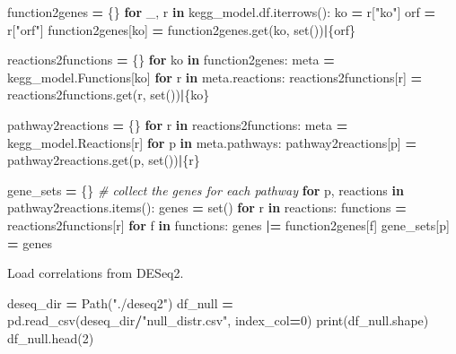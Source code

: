 \documentclass[
]{book}
\newenvironment{Shaded}{\begin{snugshade}}{\end{snugshade}}
\newcommand{\BuiltInTok}[1]{#1}
\newcommand{\CommentTok}[1]{\textcolor[rgb]{0.56,0.35,0.01}{\textit{#1}}}
\newcommand{\ControlFlowTok}[1]{\textcolor[rgb]{0.13,0.29,0.53}{\textbf{#1}}}
\newcommand{\DecValTok}[1]{\textcolor[rgb]{0.00,0.00,0.81}{#1}}
\newcommand{\KeywordTok}[1]{\textcolor[rgb]{0.13,0.29,0.53}{\textbf{#1}}}
\newcommand{\NormalTok}[1]{#1}
\newcommand{\OperatorTok}[1]{\textcolor[rgb]{0.81,0.36,0.00}{\textbf{#1}}}
\newcommand{\StringTok}[1]{\textcolor[rgb]{0.31,0.60,0.02}{#1}}
\begin{document}
\begin{Shaded}
\begin{Highlighting}[numbers=left,,]
\NormalTok{function2genes }\OperatorTok{=}\NormalTok{ \{\}}
\ControlFlowTok{for}\NormalTok{ \_, r }\KeywordTok{in}\NormalTok{ kegg\_model.df.iterrows():}
\NormalTok{    ko }\OperatorTok{=}\NormalTok{ r[}\StringTok{"ko"}\NormalTok{]}
\NormalTok{    orf }\OperatorTok{=}\NormalTok{ r[}\StringTok{"orf"}\NormalTok{]}
\NormalTok{    function2genes[ko] }\OperatorTok{=}\NormalTok{ function2genes.get(ko, }\BuiltInTok{set}\NormalTok{())}\OperatorTok{|}\NormalTok{\{orf\}}

\NormalTok{reactions2functions }\OperatorTok{=}\NormalTok{ \{\}}
\ControlFlowTok{for}\NormalTok{ ko }\KeywordTok{in}\NormalTok{ function2genes:}
\NormalTok{    meta }\OperatorTok{=}\NormalTok{ kegg\_model.Functions[ko]}
    \ControlFlowTok{for}\NormalTok{ r }\KeywordTok{in}\NormalTok{ meta.reactions:}
\NormalTok{        reactions2functions[r] }\OperatorTok{=}\NormalTok{ reactions2functions.get(r, }\BuiltInTok{set}\NormalTok{())}\OperatorTok{|}\NormalTok{\{ko\}}

\NormalTok{pathway2reactions }\OperatorTok{=}\NormalTok{ \{\}}
\ControlFlowTok{for}\NormalTok{ r }\KeywordTok{in}\NormalTok{ reactions2functions:}
\NormalTok{    meta }\OperatorTok{=}\NormalTok{ kegg\_model.Reactions[r]}
    \ControlFlowTok{for}\NormalTok{ p }\KeywordTok{in}\NormalTok{ meta.pathways:}
\NormalTok{        pathway2reactions[p] }\OperatorTok{=}\NormalTok{ pathway2reactions.get(p, }\BuiltInTok{set}\NormalTok{())}\OperatorTok{|}\NormalTok{\{r\}}

\NormalTok{gene\_sets }\OperatorTok{=}\NormalTok{ \{\} }\CommentTok{\# collect the genes for each pathway}
\ControlFlowTok{for}\NormalTok{ p, reactions }\KeywordTok{in}\NormalTok{ pathway2reactions.items():}
\NormalTok{    genes }\OperatorTok{=} \BuiltInTok{set}\NormalTok{()}
    \ControlFlowTok{for}\NormalTok{ r }\KeywordTok{in}\NormalTok{ reactions:}
\NormalTok{        functions }\OperatorTok{=}\NormalTok{ reactions2functions[r]}
        \ControlFlowTok{for}\NormalTok{ f }\KeywordTok{in}\NormalTok{ functions:}
\NormalTok{            genes }\OperatorTok{|=}\NormalTok{ function2genes[f]}
\NormalTok{    gene\_sets[p] }\OperatorTok{=}\NormalTok{ genes}
\end{Highlighting}
\end{Shaded}

Load correlations from DESeq2.

\begin{Shaded}
\begin{Highlighting}[numbers=left,,]
\NormalTok{deseq\_dir }\OperatorTok{=}\NormalTok{ Path(}\StringTok{"./deseq2"}\NormalTok{)}
\NormalTok{df\_null }\OperatorTok{=}\NormalTok{ pd.read\_csv(deseq\_dir}\OperatorTok{/}\StringTok{"null\_distr.csv"}\NormalTok{, index\_col}\OperatorTok{=}\DecValTok{0}\NormalTok{)}
\BuiltInTok{print}\NormalTok{(df\_null.shape)}
\NormalTok{df\_null.head(}\DecValTok{2}\NormalTok{)}
\end{Highlighting}
\end{Shaded}
\end{document}
